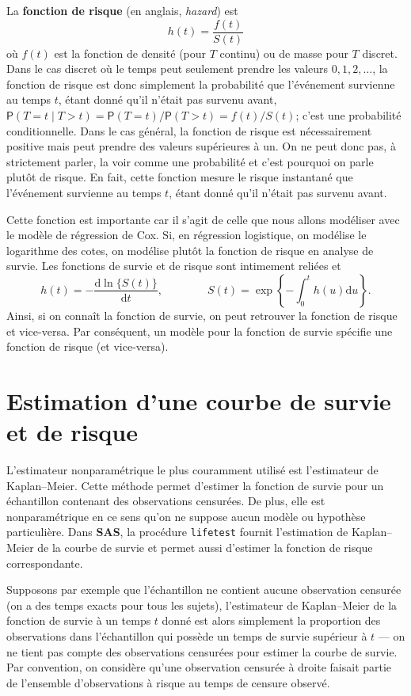 \documentclass[
  11pt,
  letterpaper,
]{book}
\theoremstyle{definition}
\theoremstyle{definition}
\theoremstyle{definition}
\theoremstyle{remark}
\begin{document}
La \textbf{fonction de risque} (en anglais, \emph{hazard}) est
\[h(t) =  \frac{f(t)}{S(t)}\]
où \(f(t)\) est la fonction de densité (pour \(T\) continu) ou de masse pour \(T\) discret.
Dans le cas discret où le temps peut seulement prendre les valeurs \(0, 1, 2, \ldots\), la fonction de risque est donc simplement la probabilité que l'événement survienne au temps \(t\), étant donné qu'il n'était pas survenu avant, \({\mathsf P}\left(T=t \mid T > t\right) = {\mathsf P}\left(T=t\right) / {\mathsf P}\left(T >t\right) = f(t)/S(t)\); c'est une probabilité conditionnelle. Dans le cas général, la fonction de risque est nécessairement positive mais peut prendre des valeurs supérieures à un. On ne peut donc pas, à strictement parler, la voir comme une probabilité et c'est pourquoi on parle plutôt de risque. En fait, cette fonction mesure le risque instantané que l'événement survienne au temps \(t\), étant donné qu'il n'était pas survenu avant.

Cette fonction est importante car il s'agit de celle que nous allons modéliser avec le modèle de régression de Cox. Si, en régression logistique, on modélise le logarithme des cotes, on modélise plutôt la fonction de risque en analyse de survie.
Les fonctions de survie et de risque sont intimement reliées et
\[ h(t) = - \frac{\mathrm{d}\ln\{S(t)\}}{\mathrm{d}t}, \qquad \qquad S(t) = \exp \left\{ -\int_0^t h(u) \mathrm{d}u\right\}. \]
Ainsi, si on connaît la fonction de survie, on peut retrouver la fonction de risque et vice-versa. Par conséquent, un modèle pour la fonction de survie spécifie une fonction de risque (et vice-versa).

\hypertarget{estimation-dune-courbe-de-survie-et-de-risque}{%
\section{Estimation d'une courbe de survie et de risque}\label{estimation-dune-courbe-de-survie-et-de-risque}}

L'estimateur nonparamétrique le plus couramment utilisé est l'estimateur de Kaplan--Meier. Cette méthode permet d'estimer la fonction de survie pour un échantillon contenant des observations censurées. De plus, elle est nonparamétrique en ce sens qu'on ne suppose aucun modèle ou hypothèse particulière. Dans \textbf{SAS}, la procédure \texttt{lifetest} fournit l'estimation de Kaplan--Meier de la courbe de survie et permet aussi d'estimer la fonction de risque correspondante.

Supposons par exemple que l'échantillon ne contient aucune observation censurée (on a des temps exacts pour tous les sujets), l'estimateur de Kaplan--Meier de la fonction de survie à un temps \(t\) donné est alors simplement la proportion des observations dans l'échantillon qui possède un temps de survie supérieur à \(t\) --- on ne tient pas compte des observations censurées pour estimer la courbe de survie. Par convention, on considère qu'une observation censurée à droite faisait partie de l'ensemble d'observations à risque au temps de censure observé.
\end{document}
